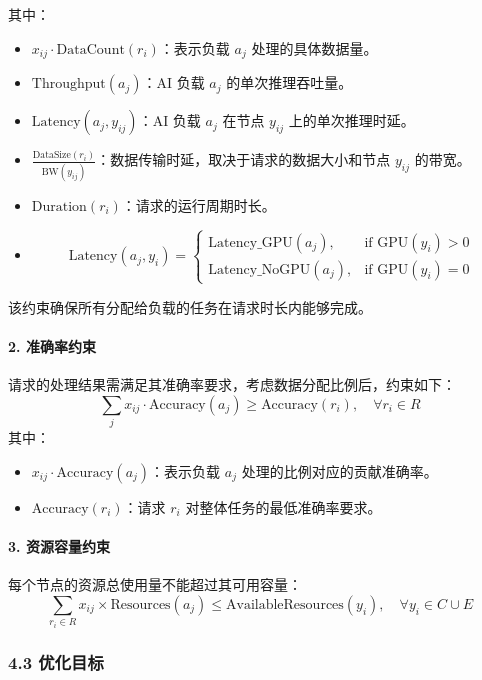 其中：
\begin{itemize}
    \item \( x_{ij} \cdot \text{DataCount}(r_i) \)：表示负载 \( a_j \) 处理的具体数据量。
    \item \( \text{Throughput}(a_j) \)：AI 负载 \( a_j \) 的单次推理吞吐量。
    \item \( \text{Latency}(a_j, y_{ij}) \)：AI 负载 \( a_j \) 在节点 \( y_{ij} \) 上的单次推理时延。
    \item \( \frac{\text{DataSize}(r_i)}{\text{BW}(y_{ij})} \)：数据传输时延，取决于请求的数据大小和节点 \( y_{ij} \) 的带宽。
    \item \( \text{Duration}(r_i) \)：请求的运行周期时长。
    \item \[
            \text{Latency}(a_j, y_i) =
            \begin{cases} 
            \text{Latency\_GPU}(a_j), & \text{if } \text{GPU}(y_i) > 0 \\
            \text{Latency\_NoGPU}(a_j), & \text{if } \text{GPU}(y_i) = 0
            \end{cases}
        \]
\end{itemize}

该约束确保所有分配给负载的任务在请求时长内能够完成。

\paragraph*{2. 准确率约束}

请求的处理结果需满足其准确率要求，考虑数据分配比例后，约束如下：
\[
\sum_{j} x_{ij} \cdot \text{Accuracy}(a_j) \geq \text{Accuracy}(r_i), \quad \forall r_i \in R
\]
其中：
\begin{itemize}
    \item \( x_{ij} \cdot \text{Accuracy}(a_j) \)：表示负载 \( a_j \) 处理的比例对应的贡献准确率。
    \item \(\text{Accuracy}(r_i)\)：请求 \( r_i \) 对整体任务的最低准确率要求。
\end{itemize}

\paragraph*{3. 资源容量约束}
每个节点的资源总使用量不能超过其可用容量：
\[
\sum_{r_i \in R} x_{ij} \times \text{Resources}(a_j) \leq \text{AvailableResources}(y_i), \quad \forall y_i \in C \cup E
\]

\subsubsection*{4.3 优化目标}

